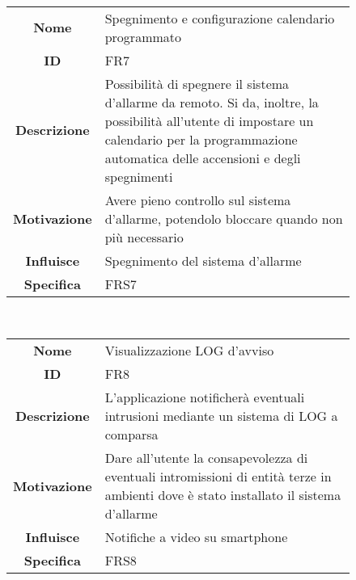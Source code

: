 \documentclass[]{article}
\begin{document}
~

\begin{figure}[htbp]
\centering
\begin{tabular}{|c|l|}
\hline

\textbf{Nome}
 & 
Spegnimento e configurazione calendario programmato
\\

\textbf{ID}
 & 
FR7
\\

\textbf{Descrizione}
 & 
Possibilità di spegnere il sistema d'allarme da remoto. Si da, inoltre,
la possibilità all'utente di impostare un calendario per la
programmazione automatica delle accensioni e degli spegnimenti
\\

\textbf{Motivazione}
 & 
Avere pieno controllo sul sistema d'allarme, potendolo bloccare quando
non più necessario
\\

\textbf{Influisce}
 & 
Spegnimento del sistema d'allarme
\\

\textbf{Specifica}
 & 
FRS7
\\
\hline
\end{tabular}
\end{figure}

~

\begin{figure}[htbp]
\centering
\begin{tabular}{|c|l|}
\hline

\textbf{Nome}
 & 
Visualizzazione LOG d'avviso
\\

\textbf{ID}
 & 
FR8
\\

\textbf{Descrizione}
 & 
L'applicazione notificherà eventuali intrusioni mediante un sistema di
LOG a comparsa
\\

\textbf{Motivazione}
 & 
Dare all'utente la consapevolezza di eventuali intromissioni di entità
terze in ambienti dove è stato installato il sistema d'allarme
\\

\textbf{Influisce}
 & 
Notifiche a video su smartphone
\\

\textbf{Specifica}
 & 
FRS8
\\
\hline
\end{tabular}
\end{figure}
\end{document}
